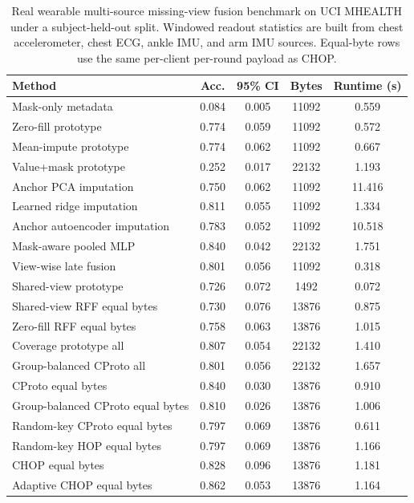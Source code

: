 ﻿\begin{table}[t]
\centering
\caption{Real wearable multi-source missing-view fusion benchmark on UCI MHEALTH under a subject-held-out split. Windowed readout statistics are built from chest accelerometer, chest ECG, ankle IMU, and arm IMU sources. Equal-byte rows use the same per-client per-round payload as CHOP.}
\label{tab:if-mhealth-fusion}
\scriptsize
\setlength{\tabcolsep}{3pt}
\renewcommand{\arraystretch}{0.94}
\begin{tabular}{lcccc}
\toprule
Method & Acc. & 95\% CI & Bytes & Runtime (s) \\
\midrule
Mask-only metadata & 0.084 & 0.005 & 11092 & 0.559 \\
Zero-fill prototype & 0.774 & 0.059 & 11092 & 0.572 \\
Mean-impute prototype & 0.774 & 0.062 & 11092 & 0.667 \\
Value+mask prototype & 0.252 & 0.017 & 22132 & 1.193 \\
Anchor PCA imputation & 0.750 & 0.062 & 11092 & 11.416 \\
Learned ridge imputation & 0.811 & 0.055 & 11092 & 1.334 \\
Anchor autoencoder imputation & 0.783 & 0.052 & 11092 & 10.518 \\
Mask-aware pooled MLP & 0.840 & 0.042 & 22132 & 1.751 \\
View-wise late fusion & 0.801 & 0.056 & 11092 & 0.318 \\
Shared-view prototype & 0.726 & 0.072 & 1492 & 0.072 \\
Shared-view RFF equal bytes & 0.730 & 0.076 & 13876 & 0.875 \\
Zero-fill RFF equal bytes & 0.758 & 0.063 & 13876 & 1.015 \\
Coverage prototype all & 0.807 & 0.054 & 22132 & 1.410 \\
Group-balanced CProto all & 0.801 & 0.056 & 22132 & 1.657 \\
CProto equal bytes & 0.840 & 0.030 & 13876 & 0.910 \\
Group-balanced CProto equal bytes & 0.810 & 0.026 & 13876 & 1.006 \\
Random-key CProto equal bytes & 0.797 & 0.069 & 13876 & 0.611 \\
Random-key HOP equal bytes & 0.797 & 0.069 & 13876 & 1.166 \\
CHOP equal bytes & 0.828 & 0.096 & 13876 & 1.181 \\
Adaptive CHOP equal bytes & 0.862 & 0.053 & 13876 & 1.164 \\
\bottomrule
\end{tabular}
\end{table}


